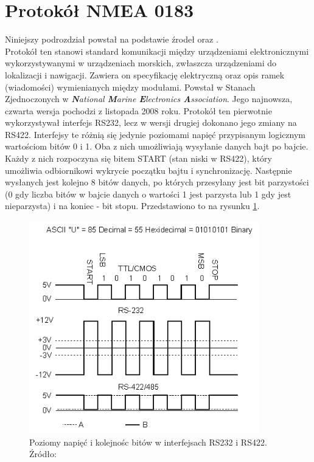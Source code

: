 \section{Protokół NMEA 0183}
\label{NMEA}

Niniejszy podrozdział powstał na podstawie źrodeł \cite{inzynierka} oraz \cite{QUECTEL_HW_DESIGN}.\\

Protokół ten stanowi standard komunikacji między urządzeniami elektronicznymi wykorzystywanymi w urządzeniach morskich, zwłaszcza urządzeniami do lokalizacji i nawigacji. Zawiera on specyfikację elektryczną oraz opis ramek (wiadomości) wymienianych między modułami. Powstał w Stanach Zjednoczonych w \textit{\textbf{N}ational \textbf{M}arine \textbf{E}lectronics \textbf{A}ssociation}. Jego najnowsza, czwarta wersja pochodzi z listopada 2008 roku. 
Protokół ten pierwotnie wykorzystywał interfejs RS232, lecz w wersji drugiej dokonano jego zmiany na RS422. Interfejsy te różnią się jedynie poziomami napięć przypisanym logicznym wartościom bitów 0 i 1. 
Oba z nich umożliwiają wysyłanie danych bajt po bajcie. Każdy z nich rozpoczyna się bitem START (stan niski w RS422), który umożliwia odbiornikowi wykrycie początku bajtu i synchronizację. Następnie wysłanych jest kolejno 8 bitów danych, po których przesyłany jest bit parzystości (0 gdy liczba bitów w bajcie danych o wartości 1 jest parzysta lub 1 gdy jest nieparzysta) i na koniec - bit stopu. Przedstawiono to na rysunku \ref{fig:image_nmea_rs422}.

\begin{figure}[H]
	\centering
	\includegraphics[width=10cm]{img/theory/NMEA/RS232_RS422.png}
	\caption{Poziomy napięć i kolejnośc bitów w interfejsach RS232 i RS422. Źródło: \cite{RS422}}
	\label{fig:image_nmea_rs422}
\end{figure}


